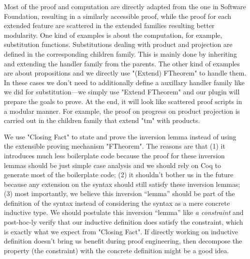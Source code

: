Most of the proof and computation are directly adapted
from the one in Software Foundation, resulting in a similarly accessible proof, while the proof for each extended feature are scattered in the extended families resulting better modularity. One kind of examples is about the computation, for example, substitution functions. Substitutions dealing with product and projection are defined in the corresponding children family. This is mainly done by inheriting and extending the handler family from the parents. The other kind of examples are about propositions and we directly use "(Extend) FTheorem" to handle them. In these cases we don't need to additionally define a auxillary handler family like we did for substitution---we simply use "Extend FTheorem" and our plugin will prepare the goals to prove. At the end, it will look like scattered proof scripts in a modular manner.
For example, the proof on progress on product projection is carried out in the children family that extend "tm" with products. 

We use "Closing Fact" to state and prove the inversion lemma instead of
using the extensible proving mechanism "FTheorem". The reasons are that
(1) it introduces much less boilerplate code because the proof for these
inversion lemmas should be just simple case analysis and we should rely
on Coq to generate most of the boilerplate code; (2) it shouldn't bother us in the future
because any extension on the syntax should still satisfy these inversion
lemmas; (3) most importantly, we believe this inversion ``lemma'' should
be part of the definition of the syntax instead of considering the
syntax as a mere concrete inductive type. We should postulate this
inversion ``lemma'' like \textit{a constraint} and post-hoc-ly verify
that our inductive definition does satisfy the constraint, which is
exactly what we expect from "Closing Fact". If directly working on inductive definition doesn't bring us benefit during proof engineering, then decompose the property (the constraint) with the concrete definition might be a good idea.

